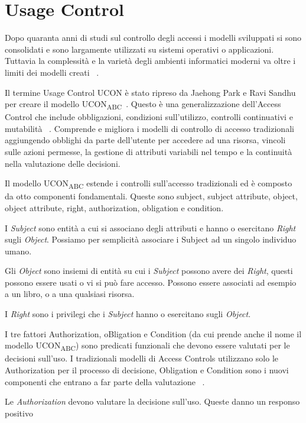 \section{Usage Control}
\label{sec:Usage_Control}
Dopo quaranta anni di studi sul controllo degli accessi i modelli sviluppati si sono consolidati e sono largamente utilizzati
su sistemi operativi o applicazioni. Tuttavia la complessità e la varietà degli ambienti informatici moderni va oltre i limiti
dei modelli creati ~\cite{uconSN}.\par
Il termine Usage Control \ac{UCON} è stato ripreso da Jaehong Park e Ravi Sandhu per creare il modello UCON\textsubscript{ABC}~\cite{ucon}.
Questo è una generalizzazione dell'Access Control che include obbligazioni, condizioni sull'utilizzo,
controlli continuativi e mutabilità ~\cite{UCRT}. Comprende e migliora i modelli di controllo di accesso tradizionali aggiungendo
obblighi da parte dell'utente per accedere ad una risorsa, vincoli sulle azioni permesse,
la gestione di attributi variabili nel tempo e la continuità nella valutazione delle decisioni.\par
Il modello UCON\textsubscript{ABC} estende i controlli sull'accesso tradizionali ed è composto da otto componenti fondamentali.
Queste sono subject, subject attribute, object, object attribute, right, authorization, obligation e condition.\par
{}
I \emph{Subject} sono entità a cui si associano degli attributi e hanno o esercitano \emph{Right} sugli \emph{Object}. Possiamo per semplicità
associare i Subject ad un singolo individuo umano.\par
Gli \emph{Object} sono insiemi di entità su cui i \emph{Subject} possono avere dei \emph{Right}, questi possono essere usati o vi si può
fare accesso. Possono essere associati ad esempio a un libro, o a una qualsiasi risorsa.\par
I \emph{Right} sono i privilegi che i \emph{Subject} hanno o esercitano sugli \emph{Object}.\par
I tre fattori Authorization, oBligation e Condition (da cui prende anche il
nome il modello UCON\textsubscript{ABC}) sono predicati funzionali che devono essere valutati per le decisioni sull'uso.
I tradizionali modelli di Access Controls utilizzano solo le Authorization per il processo di decisione, Obligation e Condition
sono i nuovi componenti che entrano a far parte della valutazione ~\cite{IEEE}.\par
Le \emph{Authorization} devono valutare la decisione sull'uso. Queste danno un responso positivo
